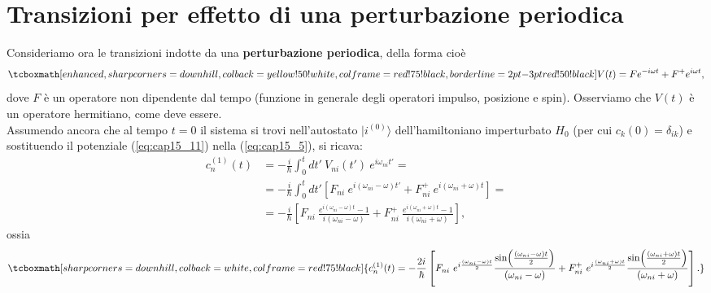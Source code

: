 \documentclass[a4paper,12pt,oneside]{book}
\begin{document}
\section{Transizioni per effetto di una perturbazione periodica}
Consideriamo ora le transizioni indotte da una \textbf{perturbazione periodica}, della forma cioè
	\begin{equation}
		\tcboxmath[enhanced, sharp corners=downhill, colback=yellow!50!white, colframe=red!75!black, borderline={2pt}{-3pt}{red!50!black}]{
			V(t) = Fe^{-i\omega t} + F^+ e ^{i\omega t},
			}
	\label{eq:cap15_11}
	\end{equation}
dove $F$ è un operatore non dipendente dal tempo (funzione in generale degli operatori impulso, posizione e spin). Osserviamo che $V(t)$ è un operatore hermitiano, come deve essere.	\\

Assumendo ancora che al tempo $t=0$ il sistema si trovi nell'autostato $\vert i ^{(0)}\rangle$ dell'hamiltoniano imperturbato $H_0$ (per cui $c_k (0) = \delta _{ik}$) e sostituendo il potenziale (\ref{eq:cap15_11}) nella (\ref{eq:cap15_5}), si ricava:
	\begin{align}
		c_n ^{(1)}(t) & =  -\frac{i}{\hbar}\int _0 ^t dt'\ V_{ni} (t') \ e^{i\omega _{ni}t'} = \nonumber \\
		&= -\frac{i}{\hbar}\int _0 ^t dt'\left[ F_{ni}\ e^{i(\omega _{ni}-\omega) t'} + F_{ni} ^+\ e ^{i(\omega _{ni} +\omega) t}\right] = \nonumber \\
		&= -\frac{i}{\hbar}\left[ F_{ni}\ \frac{e^{i(\omega _{ni}-\omega) t}-1}{i(\omega _{ni}-\omega)} + F_{ni} ^+\ \frac{e ^{i(\omega _{ni} +\omega) t}-1}{i(\omega _{ni}+\omega)}\right], 
	\end{align}
ossia
	\begin{equation}
		\tcboxmath[sharp corners=downhill, colback=white, colframe=red!75!black]{
			c_n ^{(1)}(t)= -\frac{2i}{\hbar}\left[ F_{ni}\ e^{i\frac{(\omega _{ni}-\omega) t}{2}}\frac{\sin(\frac{(\omega _{ni}-\omega) t}{2})}{(\omega _{ni}-\omega)}  + F_{ni} ^+\ e^{i\frac{(\omega _{ni}+\omega) t}{2}}\frac{\sin(\frac{(\omega _{ni}+\omega) t}{2})}{(\omega _{ni}+\omega)}\right].
			}
	\label{eq:cap15_12}
	\end{equation}\\
	
\end{document}
